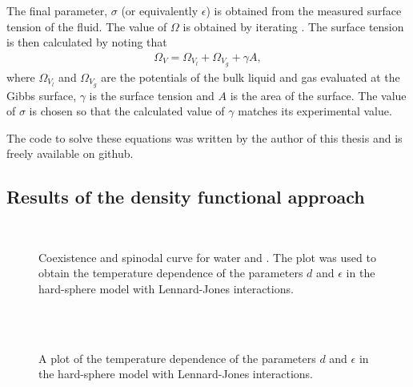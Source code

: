 The final parameter, $\sigma$ (or equivalently $\epsilon$) is obtained from the measured surface tension of the fluid.
The value of $\Omega$ is obtained by iterating .  
The surface tension is then calculated by noting that
\begin{align}
  \Omega_V = \Omega_{V_l} + \Omega_{V_g} + \gamma A,
\end{align}
where $\Omega_{V_l}$ and $\Omega_{V_g}$ are the potentials of the bulk liquid and gas evaluated at the Gibbs surface,
$\gamma$ is the surface tension and $A$ is the area of the surface.
The value of $\sigma$ is chosen so that the calculated value of $\gamma$ matches its experimental value.


The code to solve these equations was written by the author of this thesis and is freely available on github\cite{NucleationCode}.

\subsection{Results of the density functional approach}\label{sec:nuc:DFT:results}


\begin{figure}
 \centering
  \\
  \caption{Coexistence and spinodal curve for water and \pfp.
    The plot was used to obtain the temperature dependence of the parameters $d$ and $\epsilon$ 
    in the hard-sphere model with Lennard-Jones interactions.
  }
 \label{fig:nuc:coex}
\end{figure}

\begin{figure}
 \centering
  \\
  \\
  \caption{
    A plot of the  temperature dependence of the parameters $d$ and $\epsilon$ 
    in the hard-sphere model with Lennard-Jones interactions.
  }
 \label{fig:nuc:params}
\end{figure}

